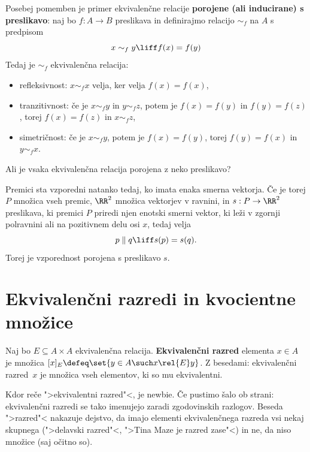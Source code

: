 Posebej pomemben je primer ekvivalenčne relacije \textbf{porojene (ali inducirane) s preslikavo}:
naj bo $f : A \to B$ preslikava in definirajmo relacijo $\sim_f$ na $A$ s predpisom
%
\begin{equation*}
  x \sim_f y \liff f(x) = f(y)
\end{equation*}
%
Tedaj je $\sim_f$ ekvivalenčna relacija:
%
\begin{itemize}
\item refleksivnost: $x \sim_f x$ velja, ker velja $f(x) = f(x)$,
\item tranzitivnost: če je $x \sim_f y$ in $y \sim_f z$, potem je $f(x) = f(y)$ in $f(y) = f(z)$, torej $f(x) = f(z)$ in $x \sim_f z$,
\item simetričnost: če je $x \sim_f y$, potem je $f(x) = f(y)$, torej $f(y) = f(x)$ in $y \sim_f x$.
\end{itemize}
%
Ali je vsaka ekvivalenčna relacija porojena z neko preslikavo?

\begin{zgled}
  Premici sta vzporedni natanko tedaj, ko imata enaka smerna vektorja. Če je
  torej $P$ množica vseh premic, $\RR^2$ množica vektorjev v ravnini, in $s : P \to \RR^2$
  preslikava, ki premici $P$ priredi njen enotski smerni vektor, ki leži v zgornji polravnini ali
  na pozitivnem delu osi $x$, tedaj velja
  \begin{equation*}
    p \parallel q \liff s(p) = s(q).
  \end{equation*}
  Torej je vzporednost porojena s preslikavo $s$.
\end{zgled}

\section{Ekvivalenčni razredi in kvocientne množice}

\begin{definicija}
  Naj bo $E \subseteq A \times A$ ekvivalenčna relacija. \textbf{Ekvivalenčni razred} elementa $x \in A$ je množica
  $[x]_E \defeq \set{ y \in A \such x \rel{E} y }$. Z besedami: ekvivalenčni razred~$x$ je množica vseh elementov, ki so mu
  ekvivalentni.
\end{definicija}

\begin{opomba}
  Kdor reče ">ekvivalentni razred"<, je newbie.
  Če pustimo šalo ob strani: ekvivalenčni razredi se tako imenujejo zaradi zgodovinskih razlogov. Beseda ">razred"< nakazuje dejstvo, da imajo elementi ekvivalenčnega razreda vsi nekaj skupnega (">delavski razred"<, ">Tina Maze je razred zase"<) in ne, da niso množice (saj očitno so).
\end{opomba}


